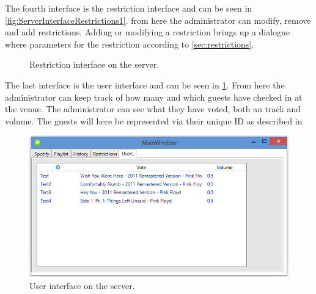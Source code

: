 The fourth interface is the restriction interface and can be seen in \cref{fig:ServerInterfaceRestrictions1}. from here the administrator can modify, remove and add restrictions. Adding or modifying a restriction brings up a dialogue where parameters for the restriction according to \cref{sec:restrictions}.

\begin{figure}[H]
  \centering
  \caption{Restriction interface on the server.}
\end{figure}

The last interface is the user interface and can be seen in \cref{fig:ServerInterfaceUsers}. From here the administrator can keep track of how many and which guests have checked in at the venue. The administrator can see what they have voted, both an track and volume. The guests will here be represented via their unique ID as described in 
\begin{figure}[hbtp]
  \centering
  \includegraphics[width=\textwidth]{Images/ServerInterfaceUsers.png}
  \caption{User interface on the server.}\label{fig:ServerInterfaceUsers}
\end{figure}